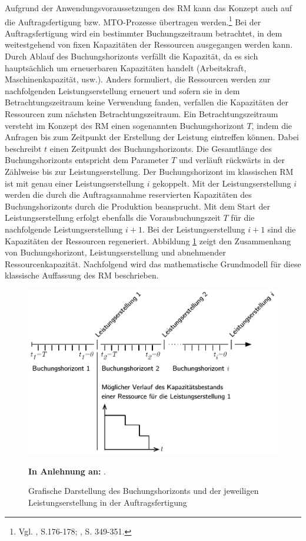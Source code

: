 Aufgrund der Anwendungsvoraussetzungen des RM kann das Konzept auch auf die Auftragsfertigung bzw. MTO-Prozesse übertragen werden.\footnote{Vgl. \cite{hintsches2010revenue}, S.176-178; \cite{kimes1989yield}, S. 349-351.} Bei der Auftragsfertigung wird ein bestimmter Buchungszeitraum betrachtet, in dem weitestgehend von fixen Kapazitäten der Ressourcen ausgegangen werden kann. Durch Ablauf des Buchungshorizonts verfällt die Kapazität, da es sich hauptsächlich um erneuerbaren Kapazitäten handelt (Arbeitskraft, Maschinenkapazität, usw.). Anders formuliert, die Ressourcen werden zur nachfolgenden Leistungserstellung erneuert und sofern sie in dem Betrachtungszeitraum keine Verwendung fanden, verfallen die Kapazitäten der Ressourcen zum nächsten Betrachtungszeitraum. Ein Betrachtungszeitraum versteht im Konzept des RM einen sogenannten Buchungshorizont $T$, indem die Anfragen bis zum Zeitpunkt der Erstellung der Leistung eintreffen können. Dabei beschreibt $t$ einen Zeitpunkt des Buchungshorizonts. Die Gesamtlänge des Buchungshorizonts entspricht dem Parameter $T$ und verläuft rückwärts in der Zählweise bis zur Leistungserstellung. Der Buchungshorizont im klassischen RM ist mit genau einer Leistungserstellung $i$ gekoppelt. Mit der Leistungserstellung $i$ werden die durch die Auftragsannahme reservierten Kapazitäten des Buchungshorizonts durch die Produktion beansprucht. Mit dem Start der Leistungserstellung erfolgt ebenfalls die Vorausbuchungszeit $T$ für die nachfolgende Leistungserstellung $i+1$. Bei der Leistungserstellung $i+1$ sind die Kapazitäten der Ressourcen regeneriert. Abbildung \ref{B0} zeigt den Zusammenhang von Buchungshorizont, Leistungserstellung und abnehmender Ressourcenkapazität. Nachfolgend wird das mathematische Grundmodell für diese klassische Auffassung des RM beschrieben.

\begin{figure}[h!]
  \begin{center}
    \includegraphics[width=140mm]{Bilder/Kapaverbrauch.pdf}
    \caption{Grafische Darstellung des Buchungshorizonts und der jeweiligen Leistungserstellung in der Auftragsfertigung}  \label{B0}
    {\footnotesize \textbf{In Anlehnung an:} \cite{lars}.} 
  \end{center}
\end{figure}


